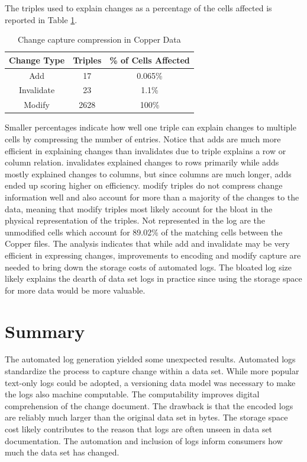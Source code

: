 The triples used to explain \glspl{change} as a percentage of the cells affected is reported in Table \ref{table:Cu_change}.
\begin{table}
	\caption{Change capture compression in Copper Data}
	\label{table:Cu_change}
	\centering
	\begin{tabular}{|c|c|c|}
		\hline
		Change Type&	Triples&	\% of Cells Affected\\ \hline
		Add&	17&	0.065\%\\
		Invalidate&	23&	1.1\%\\
		Modify&	2628&	100\%\\
		\hline
	\end{tabular}
\end{table}
Smaller percentages indicate how well one triple can explain changes to multiple cells by compressing the number of entries.
Notice that \glspl{add} are much more efficient in explaining changes than \glspl{invalidate} due to triple explains a row or column relation.
\Glspl{invalidate} explained changes to rows primarily while \glspl{add} mostly explained changes to columns, but since columns are much longer, \glspl{add} ended up scoring higher on efficiency.
\Gls{modify} triples do not compress change information well and also account for more than a majority of the changes to the data, meaning that \gls{modify} triples most likely account for the bloat in the physical representation of the triples.
Not represented in the \gls{log} are the unmodified cells which account for 89.02\% of the matching cells between the Copper files.
The analysis indicates that while \gls{add} and \gls{invalidate} may be very efficient in expressing changes, improvements to encoding and \gls{modify} capture are needed to bring down the storage costs of automated \glspl{log}.
The bloated \gls{log} size likely explains the dearth of data set \glspl{log} in practice since using the storage space for more data would be more valuable. 

\section{Summary}

The automated \gls{log} generation yielded some unexpected results.
Automated \glspl{log} standardize the process to capture change within a data set.
While more popular text-only \glspl{log} could be adopted, a versioning data model was necessary to make the logs also machine computable.
The computability improves digital comprehension of the change document.
The drawback is that the encoded \glspl{log} are reliably much larger than the original data set in bytes.
The storage space cost likely contributes to the reason that \glspl{log} are often unseen in data set documentation.
The automation and inclusion of \glspl{log} inform consumers how much the data set has changed.

